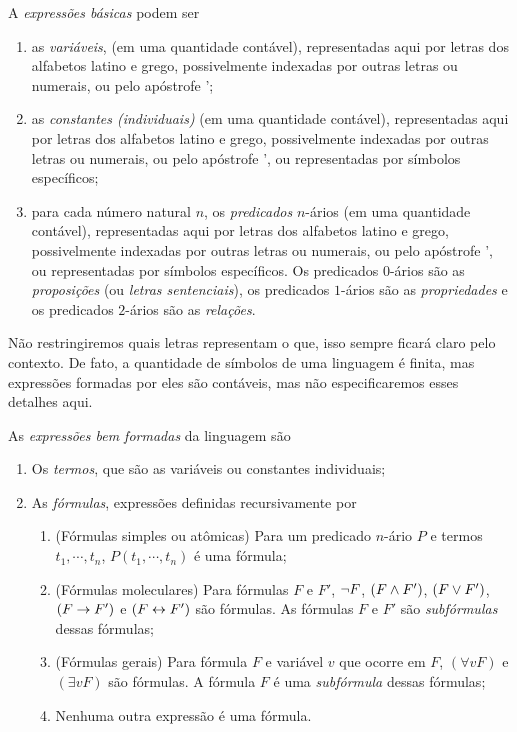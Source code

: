 A \emph{expressões básicas} podem ser
	\begin{enumerate}
	\item as \emph{variáveis}, (em uma quantidade contável), representadas aqui por letras dos alfabetos latino e grego, possivelmente indexadas por outras letras ou numerais, ou pelo apóstrofe ';

	\item as \emph{constantes (individuais)} (em uma quantidade contável), representadas aqui por letras dos alfabetos latino e grego, possivelmente indexadas por outras letras ou numerais, ou pelo apóstrofe ', ou representadas por símbolos específicos;

	\item para cada número natural $n$, os \emph{predicados} $n$-ários (em uma quantidade contável), representadas aqui por letras dos alfabetos latino e grego, possivelmente indexadas por outras letras ou numerais, ou pelo apóstrofe ', ou representadas por símbolos específicos. Os predicados $0$-ários são as \emph{proposições} (ou \emph{letras sentenciais}), os predicados $1$-ários são as \emph{propriedades} e os predicados $2$-ários são as \emph{relações}.
	\end{enumerate}

Não restringiremos quais letras representam o que, isso sempre ficará claro pelo contexto. De fato, a quantidade de símbolos de uma linguagem é finita, mas expressões formadas por eles são contáveis, mas não especificaremos esses detalhes aqui.

As \emph{expressões bem formadas} da linguagem são
	\begin{enumerate}
	\item Os \emph{termos}, que são as variáveis ou constantes individuais;

	\item As \emph{fórmulas}, expressões definidas recursivamente por
		\begin{enumerate}
		\item (Fórmulas simples ou atômicas) Para um predicado $n$-ário $P$ e termos $t_1, \cdots, t_n$, $P(t_1,\cdots,t_n)$ é uma fórmula;

		\item (Fórmulas moleculares) Para fórmulas $F$ e $F'$, $\lnot F$, $(F \land F')$, $(F \lor F')$, $(F \rightarrow F')$ e $(F \leftrightarrow F')$ são fórmulas. As fórmulas $F$ e $F'$ são \emph{subfórmulas} dessas fórmulas;

		\item (Fórmulas gerais) Para fórmula $F$ e variável $v$ que ocorre em $F$, $(\forall v F)$ e $(\exists v F)$ são fórmulas. A fórmula $F$ é uma \emph{subfórmula} dessas fórmulas;

		\item Nenhuma outra expressão é uma fórmula.
		\end{enumerate}
	\end{enumerate}


